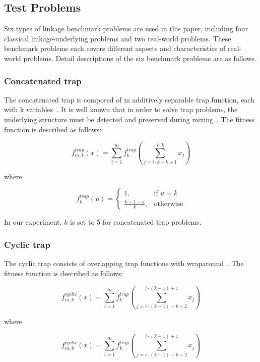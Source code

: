 \documentclass{sig-alternate-05-2015}
\begin{document}
\subsection{Test Problems}
Six types of linkage benchmark problems are used in this paper, including four classical linkage-underlying problems and two real-world problems. These benchmark problems each covers different aspects and characteristics of real-world problems. Detail descriptions of the six benchmark problems are as follows.


\subsubsection{Concatenated trap}
The concatenated trap is composed of m additively separable trap function, each with k variables~\cite{goldberg:deception}. It is well known that in order to solve trap problems, the underlying structure must be detected and preserved during mixing~\cite{pelikan:overlap}. The fitness function is described as follows:

\begin{displaymath}
f_{m,k}^{trap}(x) = \sum_{i=1}^{m} f_{k}^{trap} \left (\sum_{j = i\cdot k-k+1}^{i\cdot k} x_j\right )
\end{displaymath}

where

\begin{displaymath}
f_{k}^{trap}(u) = 
   \begin{cases}
    1, & \text{if $u=k$} \\
    \frac{k-1-u}{k}, & \text{otherwise}
	\end{cases}
\end{displaymath}

In our experiment, $k$ is set to 5 for concatenated trap problems.


\subsubsection{Cyclic trap}
The cyclic trap consists of overlapping trap functions with wraparound~\cite{yu:overlapping}. The fitness function is described as follows:

\begin{displaymath}
f_{m,k}^{cyclic}(x) = \sum_{i=1}^{m} f_{k}^{trap} \left (\sum_{j = i\cdot(k-1)-k+2}^{i\cdot(k-1)+1} x_j\right )
\end{displaymath}

where

\begin{displaymath}
f_{m,k}^{cyclic}(x) = \sum_{i=1}^{m} f_{k}^{trap} \left (\sum_{j = i\cdot(k-1)-k+2}^{i\cdot(k-1)+1} x_j\right )
\end{displaymath}
\end{document}
